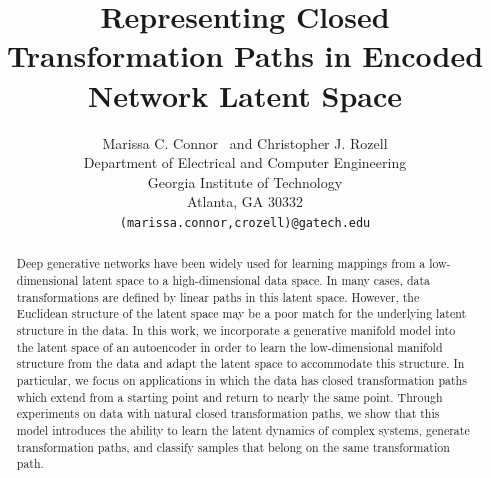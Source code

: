 \documentclass[letterpaper]{article} %
\title{Representing Closed Transformation Paths in Encoded Network Latent Space}
\author{
  Marissa C. Connor \ and Christopher J. Rozell\\
  Department of Electrical and Computer Engineering\\
  Georgia Institute of Technology\\
  Atlanta, GA 30332 \\
  \texttt{(marissa.connor,crozell)@gatech.edu} \\
}
\begin{document}
\maketitle

\begin{abstract}
Deep generative networks have been widely used for learning mappings from a low-dimensional latent space to a high-dimensional data space. In many cases, data transformations are defined by linear paths in this latent space. However, the Euclidean structure of the latent space may be a poor match for the underlying latent structure in the data. In this work, we incorporate a generative manifold model into the latent space of an autoencoder in order to learn the low-dimensional manifold structure from the data and adapt the latent space to accommodate this structure. In particular, we focus on applications in which the data has closed transformation paths which extend from a starting point and return to nearly the same point. Through experiments on data with natural closed transformation paths, we show that this model introduces the ability to learn the latent dynamics of complex systems, generate transformation paths, and classify samples that belong on the same transformation path.
\end{abstract}
\end{document}
